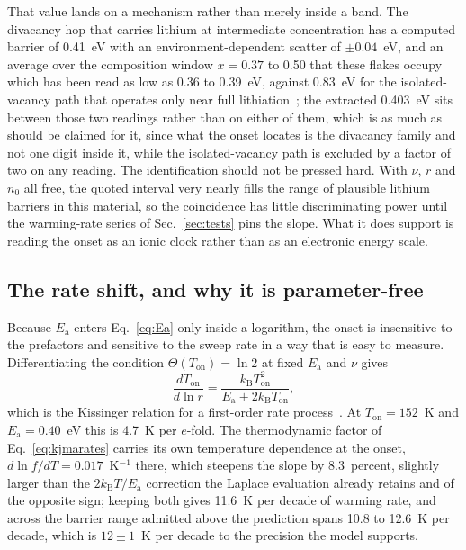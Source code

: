 \documentclass[reprint,twocolumn,prb,amsmath,amssymb,superscriptaddress,floatfix]{revtex4-2}
\newcommand{\kB}{k_{\mathrm{B}}}
\newcommand{\Ea}{E_{\mathrm{a}}}
\newcommand{\Ton}{T_{\mathrm{on}}}
\begin{document}
That value lands on a mechanism rather than merely inside a band. The divacancy hop that carries
lithium at intermediate concentration has a computed barrier of 0.41~eV with an
environment-dependent scatter of $\pm0.04$~eV, and an average over the composition
window $x=0.37$ to 0.50 that these flakes occupy which has been read as low as 0.36 to 0.39~eV,
against 0.83~eV for the isolated-vacancy path
that operates only near full lithiation~\cite{VanderVen2001b}; the extracted 0.403~eV sits
between those two readings rather than on either of them, which is as much as should be claimed
for it, since what the onset locates is the divacancy family and not one digit inside it, while
the isolated-vacancy path is excluded by a factor of two on any reading.
The identification should not be pressed
hard. With $\nu$, $r$ and $n_{0}$ all free, the quoted interval very nearly fills the range of
plausible lithium barriers in this material, so the coincidence has little discriminating power
until the warming-rate series of Sec.~\ref{sec:tests} pins the slope. What it does support is
reading the onset as an ionic clock rather than as an electronic energy scale.

\subsection{The rate shift, and why it is parameter-free}

Because $\Ea$ enters Eq.~\eqref{eq:Ea} only inside a logarithm, the onset is insensitive to the
prefactors and sensitive to the sweep rate in a way that is easy to measure. Differentiating
the condition $\Theta(\Ton)=\ln2$ at fixed $\Ea$ and $\nu$ gives
\begin{equation}
  \frac{d\Ton}{d\ln r} = \frac{\kB\Ton^{2}}{\Ea+2\kB\Ton},
  \label{eq:rateshift}
\end{equation}
which is the Kissinger relation for a first-order rate process~\cite{Kissinger1957}. At
$\Ton=152$~K and $\Ea=0.40$~eV this is 4.7~K per $e$-fold. The thermodynamic factor of
Eq.~\eqref{eq:kjmarates} carries its own temperature dependence at the onset,
$d\ln f/dT=0.017$~K$^{-1}$ there, which steepens the slope by 8.3~percent, slightly larger than
the $2\kB T/\Ea$ correction the Laplace evaluation already retains and of the opposite sign; keeping
both gives 11.6~K per decade of warming rate, and across the barrier range admitted above the
prediction spans 10.8 to 12.6~K per decade, which is $12\pm1$~K per decade to the precision the
model supports.
\end{document}
